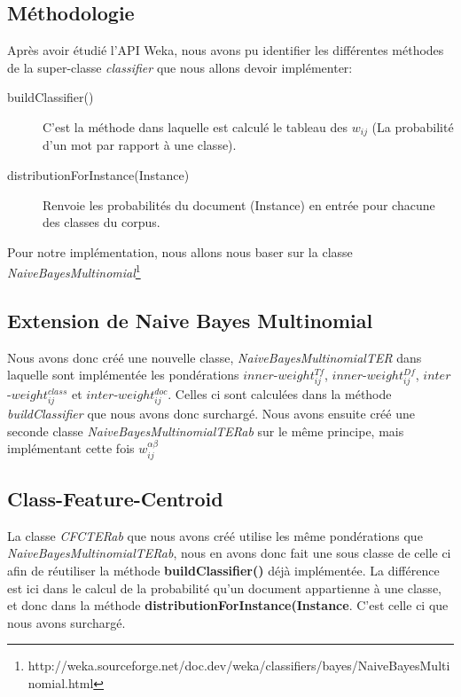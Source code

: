 \documentclass{article}
\begin{document}
\subsection{Méthodologie}
Après avoir étudié l'API Weka, nous avons pu identifier les différentes méthodes de la super-classe \textit{classifier} que nous allons devoir implémenter:
\begin{description}
\item[buildClassifier()]  C'est la méthode dans laquelle est calculé le tableau des $w_{ij}$ (La probabilité d'un mot par rapport à une classe).
\item[distributionForInstance(Instance)] Renvoie les probabilités du document (Instance) en entrée pour chacune des classes du corpus.
\end{description}
 Pour notre implémentation, nous allons nous baser sur la classe \textit{NaiveBayesMultinomial}\footnote{http://weka.sourceforge.net/doc.dev/weka/classifiers/bayes/NaiveBayesMultinomial.html}
\subsection{Extension de Naive Bayes Multinomial}
Nous avons donc créé une nouvelle classe, \textit{NaiveBayesMultinomialTER} dans laquelle sont implémentée les pondérations $inner$-$weight_{ij}^{Tf}$, $inner$-$weight_{ij}^{Df}$, $inter$-$weight_{ij}^{class}$ et $inter$-$weight_{ij}^{doc}$. Celles ci sont calculées dans la méthode \textit{buildClassifier} que nous avons donc surchargé.
\medskip
Nous avons ensuite créé une seconde classe \textit{NaiveBayesMultinomialTERab} sur le même principe, mais implémentant cette fois $w_{ij}^{\alpha \beta}$
\subsection{Class-Feature-Centroid}
La classe \textit{CFCTERab} que nous avons créé utilise les même pondérations que \textit{NaiveBayesMultinomialTERab}, nous en avons donc fait une sous classe de celle ci afin de réutiliser la méthode \textbf{buildClassifier()} déjà implémentée. La différence est ici dans le calcul de la probabilité qu'un document appartienne à une classe, et donc dans la méthode \textbf{distributionForInstance(Instance}. C'est celle ci que nous avons surchargé.
\end{document}
